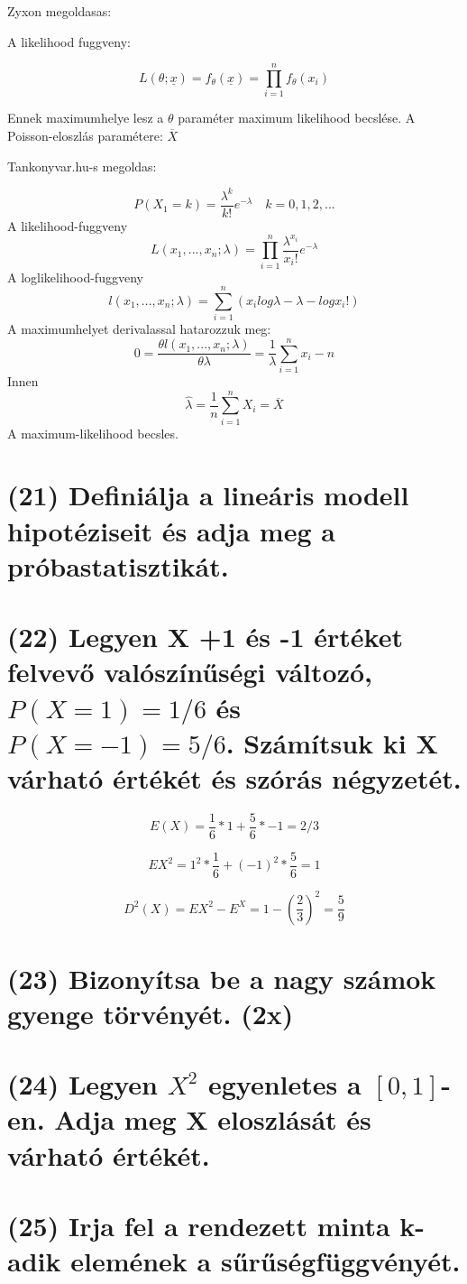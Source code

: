 \documentclass[12p]{article}
\begin{document}
Zyxon megoldasas:

A likelihood fuggveny:

$$L(\theta;\underline{x}) = f_{\theta}(\underline{x}) = \prod^n_{i=1} f_{\theta}(x_i)$$

Ennek maximumhelye lesz a $\theta$ paraméter maximum likelihood becslése. A Poisson-eloszlás paramétere: $\overline{X}$

Tankonyvar.hu-s megoldas:

$$P(X_1 = k) = \frac{\lambda^k}{k!}e^{-\lambda}\quad k=0, 1, 2, ...$$
A likelihood-fuggveny
$$L(x_1, ..., x_n;\lambda)=\prod^n_{i=1}\frac{\lambda^{x_i}}{x_i!}e^{-\lambda}$$
A loglikelihood-fuggveny
$$l(x_1, ..., x_n;\lambda) = \sum^n_{i=1}(x_i log \lambda - \lambda - log x_i!)$$
A maximumhelyet derivalassal hatarozzuk meg:
$$0 = \frac{\theta l(x_1, ..., x_n;\lambda)}{\theta \lambda} = \frac{1}{\lambda} \sum^n_{i=1} x_i - n$$
Innen
$$\hat{\lambda} = \frac{1}{n} \sum^n_{i=1} X_i = \overline{X}$$
A maximum-likelihood becsles.

\section{(21) Definiálja a lineáris modell hipotéziseit és adja meg a próbastatisztikát.}

\section{(22) Legyen X +1 és -1 értéket felvevő valószínűségi változó, $P(X = 1) = 1/6$ és $P(X = -1) = 5/6$. Számítsuk ki X várható értékét és szórás négyzetét.}

$$ E(X) = \frac{1}{6} * 1 + \frac{5}{6} * -1 = 2/3$$

$$ EX^2 = 1^2 * \frac{1}{6} + (-1)^2 * \frac{5}{6} = 1$$

$$ D^2(X) = EX^2 - E^X = 1 - \left(\frac{2}{3}\right)^2 = \frac{5}{9}$$

\section{(23) Bizonyítsa be a nagy számok gyenge törvényét. (2x)}

\section{(24) Legyen $X^2$ egyenletes a $[0, 1]$-en. Adja meg X eloszlását és várható értékét.}

\section{(25) Irja fel a rendezett minta k-adik elemének a sűrűségfüggvényét.}
\end{document}
